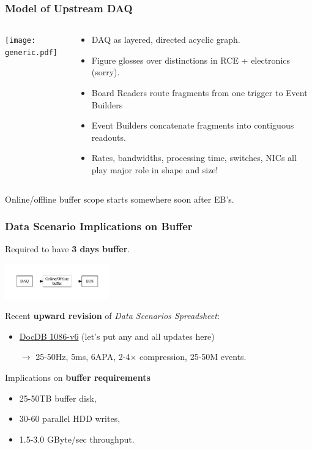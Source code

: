 \documentclass[xcolor=dvipsnames]{beamer}
\begin{document}



\begin{frame}
  \frametitle{Model of Upstream DAQ}
  \begin{columns}
    \begin{column}{0.5\textwidth}
      \begin{center}
        \texttt{[image: generic.pdf]}
      \end{center}
    \end{column}
    \begin{column}{0.5\textwidth}
      \begin{itemize}\footnotesize
        \item DAQ as layered, directed acyclic graph.
        \item Figure glosses over distinctions in RCE + electronics (sorry).
        \item Board Readers route fragments from one trigger to Event Builders
        \item Event Builders concatenate fragments into contiguous readouts.
        \item Rates, bandwidths, processing time, switches, NICs all play major role in shape and size!
      \end{itemize}
    \end{column}
  \end{columns}
  \begin{center}
    Online/offline buffer scope starts somewhere soon after EB's.
  \end{center}
\end{frame}


\begin{frame}
  \frametitle{Data Scenario Implications on Buffer}

  Required to have \textbf{3 days buffer}.

  \begin{center}
    \includegraphics[height=1.5cm,clip,trim=0 10mm 0 10mm]{big-picture.pdf}
  \end{center}

  Recent \textbf{upward revision} of \textit{Data Scenarios Spreadsheet}:
  \begin{itemize}
  \item \href{http://docs.dunescience.org:8080/cgi-bin/ShowDocument?docid=1086}{DocDB 1086-v6} (let's put any and all updates here)
  \item[$\rightarrow$] 25-50Hz, 5ms, 6APA, 2-4$\times$ compression, 25-50M events.
  \end{itemize}
  Implications on \textbf{buffer requirements}
  \begin{itemize}
  \item 25-50TB buffer disk, 
  \item 30-60 parallel HDD writes, 
  \item 1.5-3.0 GByte/sec throughput.
  \end{itemize}
\end{frame}
\end{document}
